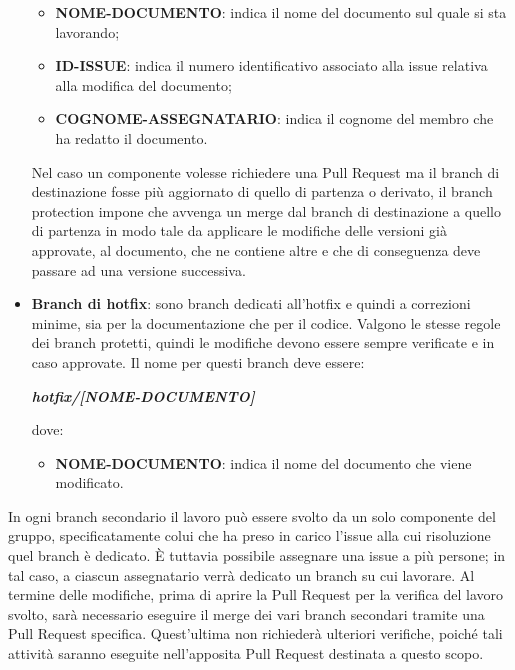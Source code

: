 \begin{itemize}
            \begin{itemize}
                \item \textbf{NOME-DOCUMENTO}: indica il nome del documento sul quale si sta lavorando;
                \item \textbf{ID-ISSUE}: indica il numero identificativo associato alla issue relativa alla modifica del documento;
                \item \textbf{COGNOME-ASSEGNATARIO}: indica il cognome del membro che ha redatto il documento.
            \end{itemize}
            Nel caso un componente volesse richiedere una Pull Request ma il branch di destinazione fosse più aggiornato di quello di partenza o derivato, il branch protection
            impone che avvenga un merge dal branch di destinazione a quello di partenza in modo tale da applicare le modifiche delle versioni già approvate, al documento, che ne contiene
            altre e che di conseguenza deve passare ad una versione successiva.
            \item \textbf{Branch di hotfix}: sono branch dedicati all'hotfix e quindi a correzioni minime, sia per la documentazione che per il codice. Valgono le stesse regole dei
            branch protetti, quindi le modifiche devono essere sempre verificate e in caso approvate.
            Il nome per questi branch deve essere:
            \begin{center}
                \textbf{\textit{hotfix/[NOME-DOCUMENTO]}}
            \end{center}
            dove:

            \begin{itemize}
                \item \textbf{NOME-DOCUMENTO}: indica il nome del documento che viene modificato.
            \end{itemize}
        \end{itemize}

        In ogni branch secondario il lavoro può essere svolto da un solo componente del gruppo, specificatamente colui che ha preso in carico l'issue alla cui risoluzione quel branch è dedicato.
        È tuttavia possibile assegnare una issue a più persone; in tal caso, a ciascun assegnatario verrà dedicato un branch su cui lavorare. Al termine delle modifiche, prima di aprire la Pull Request 
        per la verifica del lavoro svolto, sarà necessario eseguire il merge dei vari branch secondari tramite una Pull Request specifica. Quest'ultima non richiederà ulteriori verifiche, poiché tali attività
        saranno eseguite nell'apposita Pull Request destinata a questo scopo.
    
